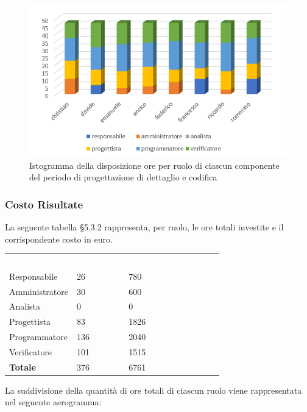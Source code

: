 \begin{figure}[h]
	\centering
	\includegraphics[scale=2]{sezioni/Istogrammi/IstogrammaDiDettaglio.png}
	\caption{Istogramma della disposizione ore per ruolo di ciascun componente del periodo di progettazione di dettaglio e codifica}
\end{figure}

\subsubsection{Costo Risultate}
La seguente tabella §5.3.2 rappresenta, per ruolo, le ore totali investite e il corrispondente costo in euro.
{
	\renewcommand{\arraystretch}{2}
	\centering
	\begin{longtable}{ C{3cm} C{2cm} C{4cm}}
		\textcolor{white}{\textbf{Ruolo}} & \textcolor{white}{\textbf{Totale ore}} & \textcolor{white}{\textbf{Costo Ruolo in euro}}\\	
        
        Responsabile & 26 & 780 \\
        Amministratore & 30 & 600 \\
        Analista & 0 & 0 \\
        Progettista & 83 & 1826 \\
        Programmatore & 136 & 2040 \\
        Verificatore & 101 & 1515\\
        \textbf{Totale} & 376 & 6761 \\
		
	\end{longtable}
}

La suddivisione della quantità di ore totali di ciascun ruolo viene rappresentata nel seguente aerogramma:

